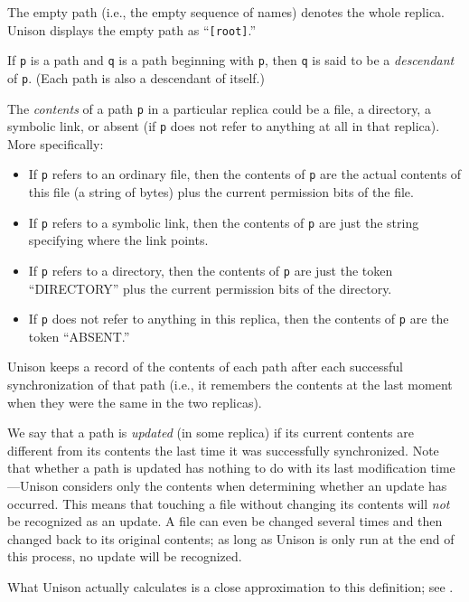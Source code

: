 \documentclass{article}
\begin{document}
The empty path (i.e., the empty sequence of names) denotes the whole
replica.  Unison displays the empty path as ``\verb|[root]|.''

If \verb|p| is a path and \verb|q| is a path beginning with \verb|p|, then
\verb|q| is said to be a {\em descendant} of \verb|p|.  (Each path is also a
descendant of itself.)



The {\em contents} of a path \verb|p| in a particular replica could be a
file, a directory, a symbolic link, or absent (if \verb|p| does not
refer to anything at all in that replica).  More specifically:
\begin{itemize}
\item If \verb|p| refers to an ordinary file, then the
contents of \verb|p| are the actual contents of this file (a string of bytes)
plus the current permission bits of the file.
\item If \verb|p| refers to a symbolic link, then the contents of \verb|p|
are just the string specifying where the link points.
\item If \verb|p| refers to a directory, then the
contents of \verb|p| are just the token ``DIRECTORY'' plus the current
permission bits of the directory.
\item If \verb|p| does not refer to anything in this replica, then the
contents of \verb|p| are the token ``ABSENT.''
\end{itemize}
Unison keeps a record of the contents of each path after each
successful synchronization of that path (i.e., it remembers the
contents at the last moment when they were the same in the two
replicas).

We say that a path is {\em updated} (in some replica) if its current
contents are different from its contents the last time it was successfully
synchronized.  Note that whether a path is updated has nothing to do with
its last modification time---Unison considers only the contents when
determining whether an update has occurred.  This means that touching a file
without changing its contents will {\em not} be recognized as an update.  A
file can even be changed several times and then changed back to its original
contents; as long as Unison is only run at the end of this process, no
update will be recognized.

What Unison actually calculates is a close approximation to this
definition; see .

\end{document}
